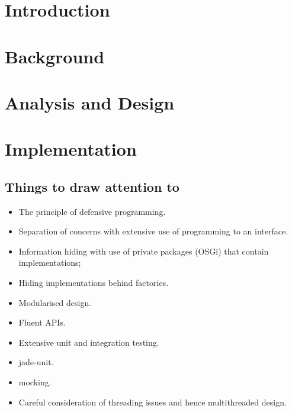 \documentclass[ openright,titlepage,numbers=noenddot,headinclude,%
                footinclude=true,BCOR=5mm,paper=a4,fontsize=11pt,a4paper,english%
                ]{scrreprt}
\begin{document}




\pagestyle{scrheadings}

\chapter{Introduction}
\label{Chapters/Introduction}





\chapter{Background}
\label{Chapters/Background}



\chapter{Analysis and Design}
\label{Chapters/Analysis-and-Design}




\chapter{Implementation}
\label{Chapters/Implementation}

\section{Things to draw attention to}
\begin{itemize}
\item The principle of defensive programming.
\item Separation of concerns with extensive use of programming to an interface.
\item Information hiding with use of private packages (OSGi) that contain implementations;
\item Hiding implementations behind factories.
\item Modularised design.
\item Fluent APIs.
\item Extensive unit and integration testing.
\item jade-unit.
\item mocking.
\item Careful consideration of threading issues and hence multithreaded design.

\end{itemize}
\end{document}
